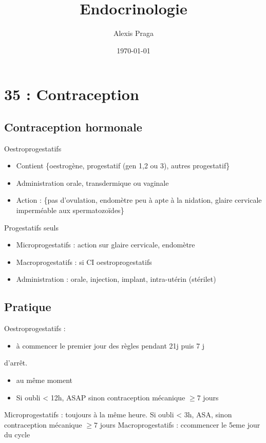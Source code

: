 \documentclass[11pt]{article}
\author{Alexis Praga}
\date{\today}
\title{Endocrinologie}
\begin{document}
\maketitle
\tableofcontents

\section{35 : Contraception}
\label{sec:org7bd0388}
\subsection{Contraception hormonale}
\label{sec:orgfd95a13}
Oestroprogestatifs
\begin{itemize}
\item Contient \{oestrogène, progestatif (gen 1,2 ou 3), autres progestatif\}
\item Administration orale, transdermique ou vaginale
\item Action : \{pas d'ovulation, endomètre peu à apte à la nidation, glaire
cervicale imperméable aux spermatozoïdes\}
\end{itemize}
Progestatifs seuls 
\begin{itemize}
\item Microprogestatifs : action sur glaire cervicale, endomètre
\item Macroprogestatifs : si CI oestroprogestatifs
\item Administration : orale, injection, implant, intra-utérin (stérilet)
\end{itemize}
\subsection{Pratique}
\label{sec:org3365aae}
Oestroprogestatifs : 
\begin{itemize}
\item à commencer le premier jour des règles pendant 21j puis 7 j
\end{itemize}
d'arrêt.
\begin{itemize}
\item au même moment
\item Si oubli < 12h, ASAP sinon contraception mécanique \(\ge 7\) jours
\end{itemize}
Microprogestatifs : toujours à la même heure. Si oubli < 3h, ASA, sinon
contraception mécanique \(\ge 7\) jours
Macroprogestatifs : ccommencer le 5eme jour du cycle
\end{document}
